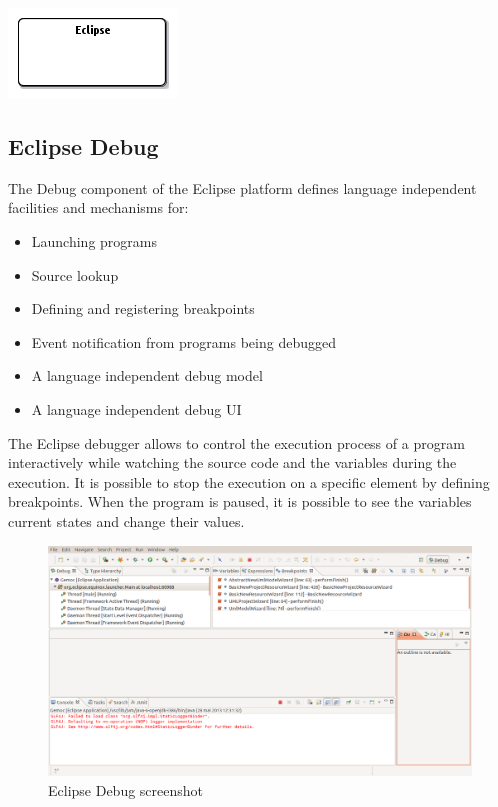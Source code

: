 \documentclass{gemoc} %
\begin{document}
\begin{center}
\includegraphics*[trim=0.0cm 0.0cm 0cm 0.0cm, clip=true]{../images/generated/Generated_Eclipse.png}
\end{center}




\subsection{Eclipse Debug}
\label{sec:Eclipse_Debug}

The Debug component of the Eclipse platform defines language independent facilities and mechanisms for:
\begin{itemize}
\item Launching programs
\item Source lookup
\item Defining and registering breakpoints
\item Event notification from programs being debugged
\item A language independent debug model
\item A language independent debug UI
\end{itemize}

The Eclipse debugger allows to control the execution process of a program interactively while watching the source code and the variables during the execution. It is possible to stop the execution on a specific element by defining breakpoints. When the program is paused, it is possible to see the variables current states and change their values.
\begin{figure}[h]
	\begin{center}
	\includegraphics*[trim=0.0cm 0.0cm 0cm 0.0cm, clip=true, width=1.0\linewidth]{../images/EclipseDebugPerspective.png}
	\caption{Eclipse Debug screenshot}
	\end{center}
\end{figure}
\end{document}
